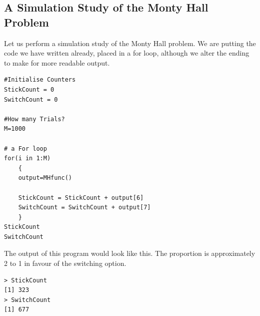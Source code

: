 \documentclass[11pt]{article} %
\begin{document}

\subsection{ A Simulation Study of the Monty Hall Problem}
Let us perform a simulation study of the Monty Hall problem. We are putting the code we have
written already, placed in a for loop, although we alter the ending to make for more readable
output.

\begin{verbatim}
#Initialise Counters
StickCount = 0   
SwitchCount = 0

#How many Trials?
M=1000

# a For loop
for(i in 1:M)
	{
	output=MHfunc()

	StickCount = StickCount + output[6]
	SwitchCount = SwitchCount + output[7]
	}
StickCount
SwitchCount
\end{verbatim}


The output of this program would look like this. The proportion is approximately 2 to 1 in
favour of the switching option.
\begin{verbatim}
> StickCount
[1] 323
> SwitchCount
[1] 677
\end{verbatim}
\end{document}
